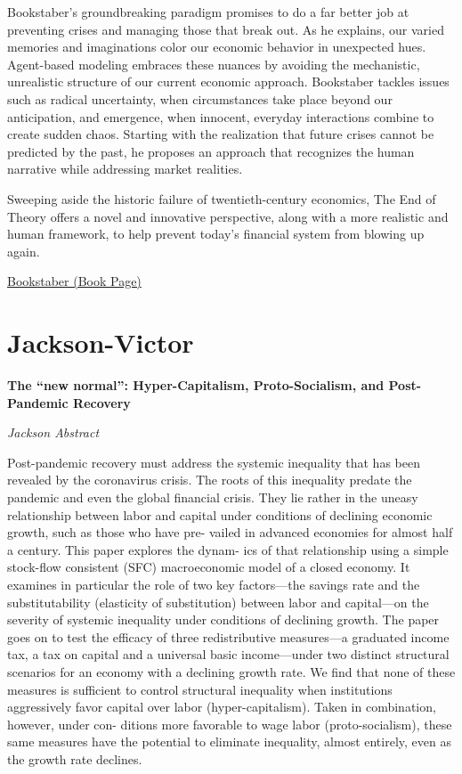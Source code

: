 \documentclass[
]{book}
\begin{document}
Bookstaber's groundbreaking paradigm promises to do a far better job at preventing crises and managing those that break out. As he explains, our varied memories and imaginations color our economic behavior in unexpected hues. Agent-based modeling embraces these nuances by avoiding the mechanistic, unrealistic structure of our current economic approach. Bookstaber tackles issues such as radical uncertainty, when circumstances take place beyond our anticipation, and emergence, when innocent, everyday interactions combine to create sudden chaos. Starting with the realization that future crises cannot be predicted by the past, he proposes an approach that recognizes the human narrative while addressing market realities.

Sweeping aside the historic failure of twentieth-century economics, The End of Theory offers a novel and innovative perspective, along with a more realistic and human framework, to help prevent today's financial system from blowing up again.

\href{https://press.princeton.edu/books/hardcover/9780691169019/the-end-of-theory}{Bookstaber (Book Page)}

\hypertarget{jackson-victor}{%
\section{Jackson-Victor}\label{jackson-victor}}

\textbf{The ``new normal'': Hyper-Capitalism, Proto-Socialism, and Post-Pandemic Recovery}

\emph{Jackson Abstract}

Post-pandemic recovery must address the systemic inequality that has been revealed
by the coronavirus crisis. The roots of this inequality predate the pandemic and even
the global financial crisis. They lie rather in the uneasy relationship between labor and
capital under conditions of declining economic growth, such as those who have pre-
vailed in advanced economies for almost half a century. This paper explores the dynam-
ics of that relationship using a simple stock-flow consistent (SFC) macroeconomic
model of a closed economy. It examines in particular the role of two key factors---the
savings rate and the substitutability (elasticity of substitution) between labor and
capital---on the severity of systemic inequality under conditions of declining growth.
The paper goes on to test the efficacy of three redistributive measures---a graduated
income tax, a tax on capital and a universal basic income---under two distinct structural
scenarios for an economy with a declining growth rate. We find that none of these
measures is sufficient to control structural inequality when institutions aggressively
favor capital over labor (hyper-capitalism). Taken in combination, however, under con-
ditions more favorable to wage labor (proto-socialism), these same measures have the
potential to eliminate inequality, almost entirely, even as the growth rate declines.
\end{document}
